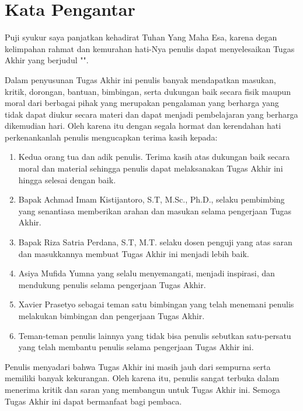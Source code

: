 \chapter*{Kata Pengantar}

Puji syukur saya panjatkan kehadirat Tuhan Yang Maha Esa, karena degan kelimpahan rahmat dan kemurahan hati-Nya penulis dapat menyelesaikan Tugas Akhir yang berjudul "\thetitle".

Dalam penyusunan Tugas Akhir ini penulis banyak mendapatkan masukan, kritik, dorongan, bantuan, bimbingan, serta dukungan baik secara fisik maupun moral dari berbagai pihak yang merupakan pengalaman yang berharga yang tidak dapat diukur secara materi dan dapat menjadi pembelajaran yang berharga dikemudian hari. Oleh karena itu dengan segala hormat dan kerendahan hati perkenankanlah penulis mengucapkan terima kasih kepada:

\begin{enumerate}
	\item Kedua orang tua dan adik penulis. Terima kasih atas dukungan baik secara moral dan material sehingga penulis dapat melaksanakan Tugas Akhir ini hingga selesai dengan baik.
	\item Bapak Achmad Imam Kistijantoro, S.T, M.Sc., Ph.D., selaku pembimbing yang senantiasa memberikan arahan dan masukan selama pengerjaan Tugas Akhir.
	\item Bapak Riza Satria Perdana, S.T, M.T. selaku dosen penguji yang atas saran dan masukkannya membuat Tugas Akhir ini menjadi lebih baik.
	\item Asiya Mufida Yumna yang selalu menyemangati, menjadi inspirasi, dan mendukung penulis selama pengerjaan Tugas Akhir.	
	\item Xavier Prasetyo sebagai teman satu bimbingan yang telah menemani penulis melakukan bimbingan dan pengerjaan Tugas Akhir. 
	\item Teman-teman penulis lainnya yang tidak bisa penulis sebutkan satu-persatu yang telah membantu penulis selama pengerjaan Tugas Akhir ini.
\end{enumerate}

Penulis menyadari bahwa Tugas Akhir ini masih jauh dari sempurna serta memiliki banyak kekurangan. Oleh karena itu, penulis sangat terbuka dalam menerima kritik dan saran yang membangun untuk Tugas Akhir ini. Semoga Tugas Akhir ini dapat bermanfaat bagi pembaca.

